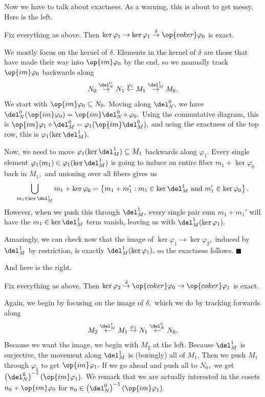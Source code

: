Now we have to talk about exactness. As a warning, this is about to get messy. Here is the left.
\begin{lemma}
    Fix everything as above. Then $\ker\varphi_1\to\ker\varphi_1\stackrel\delta\to\op{coker}\varphi_0$ is exact.
\end{lemma}
We mostly focus on the kernel of $\delta.$ Elements in the kernel of $\delta$ are those that have made their way into $\op{im}\varphi_0$ by the end, so we manually track $\op{im}\varphi_0$ backwards along
\[N_0\stackrel{\del_N^0}\to N_1\stackrel{\varphi_1}\leftarrow M_1\stackrel{\del_M^1}\to M_0.\]
We start with $\op{im}\varphi_0\subseteq N_0.$ Moving along $\del_N^0,$ we have $\del_N^0(\op{im}\varphi_0)=\op{im}\del_N^0\circ\varphi_0.$ Using the commutative diagram, this is $\op{im}\varphi_1\circ\del_M^0=\varphi_1(\op{im}\del_M^0),$ and using the exactness of the top row, this is $\varphi_1(\ker\del_M^1).$

Now, we need to move $\varphi_1(\ker\del_M^1)\subseteq M_1$ backwards along $\varphi_1.$ Every single element $\varphi_1(m_1)\in\varphi_1(\ker\del_M^1)$ is going to induce an entire fiber $m_1+\ker\varphi_0$ back in $M_1,$ and unioning over all fibers gives us
\[\bigcup_{m_1\in\ker\del_M^1}m_1+\ker\varphi_0=\left\{m_1+m_1':m_1\in\ker\del_M^1\text{ and }m_1'\in\ker\varphi_0\right\}.\]
However, when we push this through $\del_M^1,$ every single pair sum $m_1+m_1'$ will have the $m_1\in\ker\del_M^1$ term vanish, leaving us with $\del_M^1(\ker\varphi_1).$

Amazingly, we can check now that the image of $\ker\varphi_1\to\ker\varphi_2,$ induced by $\del_M^1$ by restriction, is exactly $\del_M^1(\ker\varphi_1),$ so the exactness follows. $\blacksquare$

And here is the right.
\begin{lemma}
    Fix everything as above. Then $\ker\varphi_2\stackrel\delta\to\op{coker}\varphi_0\to\op{coker}\varphi_1$ is exact.
\end{lemma}
Again, we begin by focusing on the image of $\delta,$ which we do by tracking forwards along
\[M_2\stackrel{\del_M^1}\leftarrow M_1\stackrel{\varphi_1}\to N_1\stackrel{\del_N^0}\leftarrow N_0.\]
Because we want the image, we begin with $M_2$ at the left. Because $\del_M^1$ is surjective, the movement along $\del_M^1$ is (boringly) all of $M_1.$ Then we push $M_1$ through $\varphi_1$ to get $\op{im}\varphi_1.$ If we go ahead and push all to $N_0,$ we get $\left(\del_N^0\right)^{-1}(\op{im}\varphi_1).$ We remark that we are actually interested in the cosets $n_0+\op{im}\varphi_0$ for $n_0\in\left(\del_N^0\right)^{-1}(\op{im}\varphi_1).$

